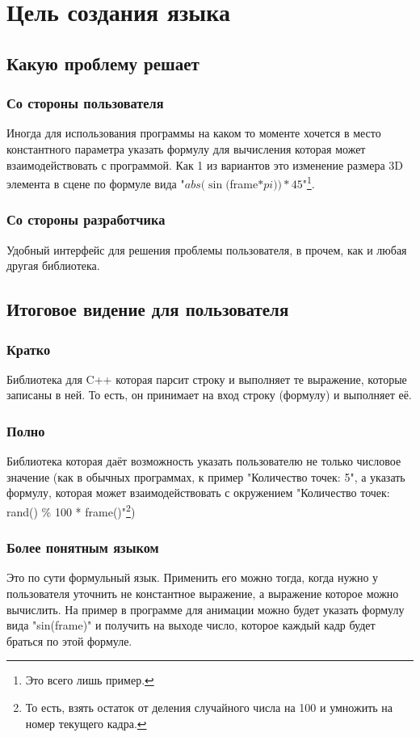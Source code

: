 \documentclass[../Language-declaration.tex]{subfiles}
\begin{document}
    \chapter{Цель создания языка}

        \section{Какую проблему решает}
            \subsection{Со стороны пользователя}
                Иногда для использования программы на каком то моменте хочется в место константного параметра указать формулу для вычисления которая может взаимодействовать с программой. Как 1 из вариантов это изменение размера 3D элемента в сцене по формуле вида "$abs(\sin($frame$*pi))*45$"\footnote{Это всего лишь пример.}.

            \subsection{Со стороны разработчика}
                Удобный интерфейс для решения проблемы пользователя, в прочем, как и любая другая библиотека.


        \section{Итоговое видение для пользователя}

            \subsection{Кратко}
                Библиотека для C++ которая парсит строку и выполняет те выражение, которые записаны в ней. То есть, он принимает на вход строку (формулу) и выполняет её.

            \subsection{Полно}
                Библиотека которая даёт возможность указать пользователю не только числовое значение (как в обычных программах, к пример "Количество точек: 5", а указать формулу, которая может взаимодействовать с окружением "Количество точек: rand() \% 100 * frame()"\footnote{То есть, взять остаток от деления случайного числа на 100 и умножить на номер текущего кадра.})

            \subsection{Более понятным языком}
                Это по сути формульный язык. Применить его можно тогда, когда нужно у пользователя уточнить не константное выражение, а выражение которое можно вычислить. На пример в программе для анимации можно будет указать формулу вида "sin(frame)" и получить на выходе число, которое каждый кадр будет браться по этой формуле.
\end{document}
